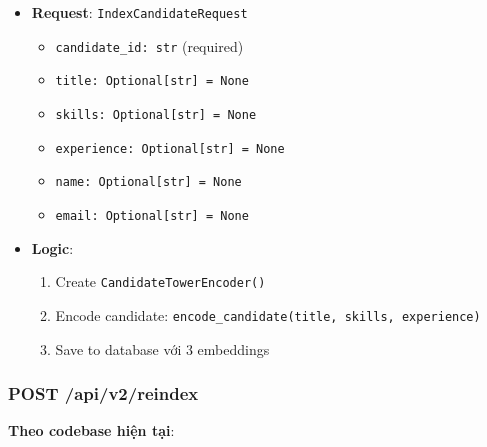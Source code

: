 \begin{itemize}
    \item \textbf{Request}: \texttt{IndexCandidateRequest}
    \begin{itemize}
        \item \texttt{candidate\_id: str} (required)
        \item \texttt{title: Optional[str] = None}
        \item \texttt{skills: Optional[str] = None}
        \item \texttt{experience: Optional[str] = None}
        \item \texttt{name: Optional[str] = None}
        \item \texttt{email: Optional[str] = None}
    \end{itemize}
    
    \item \textbf{Logic}:
    \begin{enumerate}
        \item Create \texttt{CandidateTowerEncoder()}
        \item Encode candidate: \texttt{encode\_candidate(title, skills, experience)}
        \item Save to database với 3 embeddings
    \end{enumerate}
\end{itemize}

\subsubsection{POST /api/v2/reindex}

\textbf{Theo codebase hiện tại}:

